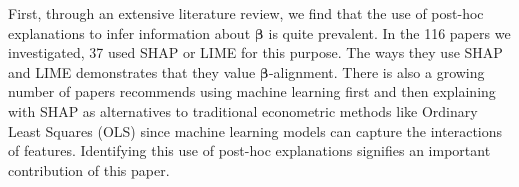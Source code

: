 \documentclass[mnsc,blindrev]{informs3}
\begin{document}
        First, through an extensive literature review, we find that the use of post-hoc explanations to infer information about $\boldsymbol{\beta}$ is quite prevalent. In the 116 papers we investigated, 37 used SHAP or LIME for this purpose. The ways they use SHAP and LIME demonstrates that they value $\boldsymbol{\beta}$-alignment. There is also a growing number of papers recommends using  machine learning first and then explaining with SHAP as alternatives to traditional econometric methods like Ordinary Least Squares (OLS) since machine learning models can capture the interactions of features. Identifying this use of post-hoc explanations signifies an important contribution of this paper. 

\end{document}

